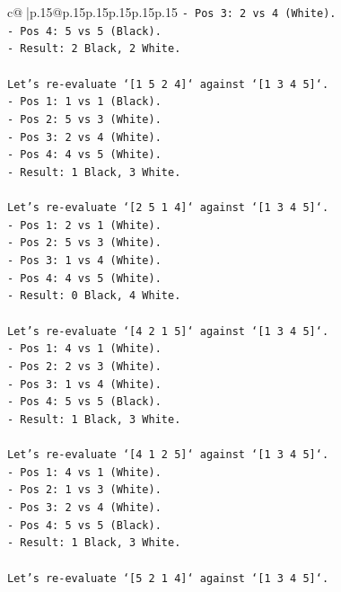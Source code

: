 \documentclass{article}
\begin{document}
{\begin{supertabular}{c@{$\;$}|p{.15\linewidth}@{}p{.15\linewidth}p{.15\linewidth}p{.15\linewidth}p{.15\linewidth}p{.15\linewidth}}
{{{\texttt{{-} Pos 3: 2 vs 4 (White).} \\
\texttt{{-} Pos 4: 5 vs 5 (Black).} \\
\texttt{{-} Result: 2 Black, 2 White.} \\
\\ 
\texttt{Let's re{-}evaluate `{[}1 5 2 4{]}` against `{[}1 3 4 5{]}`.} \\
\texttt{{-} Pos 1: 1 vs 1 (Black).} \\
\texttt{{-} Pos 2: 5 vs 3 (White).} \\
\texttt{{-} Pos 3: 2 vs 4 (White).} \\
\texttt{{-} Pos 4: 4 vs 5 (White).} \\
\texttt{{-} Result: 1 Black, 3 White.} \\
\\ 
\texttt{Let's re{-}evaluate `{[}2 5 1 4{]}` against `{[}1 3 4 5{]}`.} \\
\texttt{{-} Pos 1: 2 vs 1 (White).} \\
\texttt{{-} Pos 2: 5 vs 3 (White).} \\
\texttt{{-} Pos 3: 1 vs 4 (White).} \\
\texttt{{-} Pos 4: 4 vs 5 (White).} \\
\texttt{{-} Result: 0 Black, 4 White.} \\
\\ 
\texttt{Let's re{-}evaluate `{[}4 2 1 5{]}` against `{[}1 3 4 5{]}`.} \\
\texttt{{-} Pos 1: 4 vs 1 (White).} \\
\texttt{{-} Pos 2: 2 vs 3 (White).} \\
\texttt{{-} Pos 3: 1 vs 4 (White).} \\
\texttt{{-} Pos 4: 5 vs 5 (Black).} \\
\texttt{{-} Result: 1 Black, 3 White.} \\
\\ 
\texttt{Let's re{-}evaluate `{[}4 1 2 5{]}` against `{[}1 3 4 5{]}`.} \\
\texttt{{-} Pos 1: 4 vs 1 (White).} \\
\texttt{{-} Pos 2: 1 vs 3 (White).} \\
\texttt{{-} Pos 3: 2 vs 4 (White).} \\
\texttt{{-} Pos 4: 5 vs 5 (Black).} \\
\texttt{{-} Result: 1 Black, 3 White.} \\
\\ 
\texttt{Let's re{-}evaluate `{[}5 2 1 4{]}` against `{[}1 3 4 5{]}`.} \\
}}}
\end{supertabular}}
\end{document}
